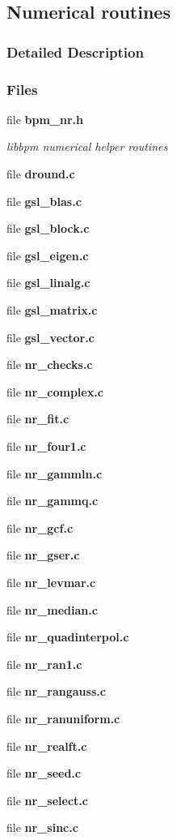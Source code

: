 \subsection{Numerical routines}
\label{group__nr}


\subsubsection{Detailed Description}


\subsubsection*{Files}
\begin{CompactItemize}
\item 
file {\bf bpm\_\-nr.h}
\begin{CompactList}\small\item\em libbpm numerical helper routines \item\end{CompactList}

\item 
file {\bf dround.c}
\item 
file {\bf gsl\_\-blas.c}
\item 
file {\bf gsl\_\-block.c}
\item 
file {\bf gsl\_\-eigen.c}
\item 
file {\bf gsl\_\-linalg.c}
\item 
file {\bf gsl\_\-matrix.c}
\item 
file {\bf gsl\_\-vector.c}
\item 
file {\bf nr\_\-checks.c}
\item 
file {\bf nr\_\-complex.c}
\item 
file {\bf nr\_\-fit.c}
\item 
file {\bf nr\_\-four1.c}
\item 
file {\bf nr\_\-gammln.c}
\item 
file {\bf nr\_\-gammq.c}
\item 
file {\bf nr\_\-gcf.c}
\item 
file {\bf nr\_\-gser.c}
\item 
file {\bf nr\_\-levmar.c}
\item 
file {\bf nr\_\-median.c}
\item 
file {\bf nr\_\-quadinterpol.c}
\item 
file {\bf nr\_\-ran1.c}
\item 
file {\bf nr\_\-rangauss.c}
\item 
file {\bf nr\_\-ranuniform.c}
\item 
file {\bf nr\_\-realft.c}
\item 
file {\bf nr\_\-seed.c}
\item 
file {\bf nr\_\-select.c}
\item 
file {\bf nr\_\-sinc.c}
\end{CompactItemize}
